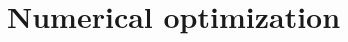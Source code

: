 \documentclass{article}
\begin{document}
\begin{enumerate}
%
%
%
\end{enumerate}
\newpage


\section{Numerical optimization}
\end{document}
